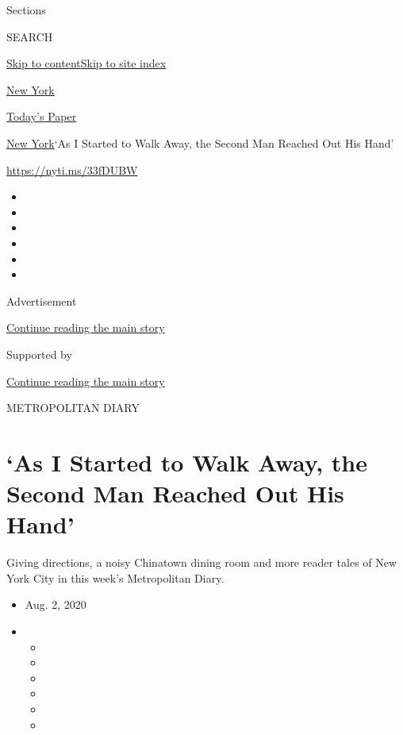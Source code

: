 Sections

SEARCH

\protect\hyperlink{site-content}{Skip to
content}\protect\hyperlink{site-index}{Skip to site index}

\href{https://www.nytimes3xbfgragh.onion/section/nyregion}{New York}

\href{https://myaccount.nytimes3xbfgragh.onion/auth/login?response_type=cookie\&client_id=vi}{}

\href{https://www.nytimes3xbfgragh.onion/section/todayspaper}{Today's
Paper}

\href{/section/nyregion}{New York}\textbar{}`As I Started to Walk Away,
the Second Man Reached Out His Hand'

\url{https://nyti.ms/33fDUBW}

\begin{itemize}
\item
\item
\item
\item
\item
\item
\end{itemize}

Advertisement

\protect\hyperlink{after-top}{Continue reading the main story}

Supported by

\protect\hyperlink{after-sponsor}{Continue reading the main story}

METROPOLITAN DIARY

\hypertarget{as-i-started-to-walk-away-the-second-man-reached-out-his-hand}{%
\section{`As I Started to Walk Away, the Second Man Reached Out His
Hand'}\label{as-i-started-to-walk-away-the-second-man-reached-out-his-hand}}

Giving directions, a noisy Chinatown dining room and more reader tales
of New York City in this week's Metropolitan Diary.

\begin{itemize}
\item
  Aug. 2, 2020
\item
  \begin{itemize}
  \item
  \item
  \item
  \item
  \item
  \item
  \end{itemize}
\end{itemize}

